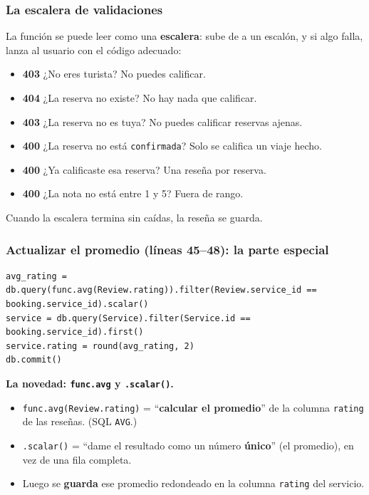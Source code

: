 \documentclass[11pt,a4paper]{article}
\begin{document}
\subsubsection{La escalera de validaciones}

La función se puede leer como una \textbf{escalera}: sube de a un escalón, y si algo falla,
lanza al usuario con el código adecuado:
\begin{itemize}
    \item \textbf{403} ¿No eres turista? No puedes calificar.
    \item \textbf{404} ¿La reserva no existe? No hay nada que calificar.
    \item \textbf{403} ¿La reserva no es tuya? No puedes calificar reservas ajenas.
    \item \textbf{400} ¿La reserva no está \texttt{confirmada}? Solo se califica un viaje hecho.
    \item \textbf{400} ¿Ya calificaste esa reserva? Una reseña por reserva.
    \item \textbf{400} ¿La nota no está entre 1 y 5? Fuera de rango.
\end{itemize}
Cuando la escalera termina sin caídas, la reseña se guarda.

\subsubsection{Actualizar el promedio (líneas 45--48): la parte especial}

\begin{lstlisting}
avg_rating = db.query(func.avg(Review.rating)).filter(Review.service_id == booking.service_id).scalar()
service = db.query(Service).filter(Service.id == booking.service_id).first()
service.rating = round(avg_rating, 2)
db.commit()
\end{lstlisting}

\textbf{La novedad: \texttt{func.avg} y \texttt{.scalar()}.}
\begin{itemize}
    \item \texttt{func.avg(Review.rating)} = ``\textbf{calcular el promedio}'' de la columna
    \texttt{rating} de las reseñas. (SQL \texttt{AVG}.)
    \item \texttt{.scalar()} = ``dame el resultado como un número \textbf{único}'' (el promedio),
    en vez de una fila completa.
    \item Luego se \textbf{guarda} ese promedio redondeado en la columna \texttt{rating} del
    servicio.
\end{itemize}
\end{document}
